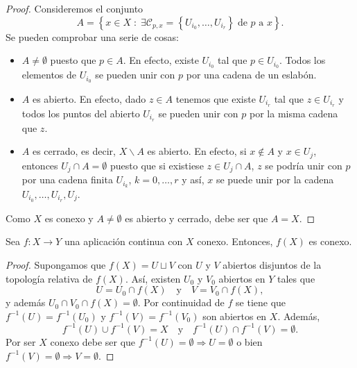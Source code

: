 \begin{proof}
Consideremos el conjunto
\[A = \left\{ x \in X\; : \; \exists\mathcal{C}_{p,x}= \left\{ U_{i_{0}}, \ldots, U_{i_{r}}\right\} \; \text{de }p\text{ a } x\right\}  .\]
Se pueden comprobar una serie de cosas:
\begin{itemize}
\item $\displaystyle A\neq \emptyset $ puesto que $\displaystyle p \in A $. En efecto, existe $\displaystyle U_{i_{0}} $ tal que $\displaystyle p \in U_{i_{0}} $. Todos los elementos de $\displaystyle U_{i_{0}} $ se pueden unir con $\displaystyle p $ por una cadena de un eslabón. 
\item $\displaystyle A $ es abierto. En efecto, dado $\displaystyle z\in A $ tenemos que existe $\displaystyle U_{i_{r}} $ tal que $\displaystyle z \in U_{i_{r}} $ y todos los puntos del abierto $\displaystyle U_{i_{r}} $ se pueden unir con $\displaystyle p $ por la misma cadena que $\displaystyle z $. 
\item $\displaystyle A $ es cerrado, es decir, $\displaystyle X \backslash A $ es abierto. En efecto, si $\displaystyle x \not\in A $ y $\displaystyle x\in U_{j} $, entonces $\displaystyle U_{j}\cap A = \emptyset $ puesto que si existiese $\displaystyle z \in U_{j}\cap A $, $\displaystyle z $ se podría unir con $\displaystyle p $ por una cadena finita $\displaystyle U_{i_{k}} $, $\displaystyle k = 0, \ldots, r $ y así, $\displaystyle x $ se puede unir por la cadena $\displaystyle U_{i_{0}}, \ldots, U_{i_{r}}, U_{j} $. 
\end{itemize}
Como $\displaystyle X $ es conexo y $\displaystyle A \neq \emptyset $ es abierto y cerrado, debe ser que $\displaystyle A = X $.
\end{proof}
\begin{prop}
Sea $\displaystyle f : X \to Y $ una aplicación continua con $\displaystyle X $ conexo. Entonces, $\displaystyle f\left(X\right) $ es conexo. 
\end{prop}
\begin{proof}
Supongamos que $\displaystyle f\left(X\right)=U\sqcup V$ con $\displaystyle U $ y $\displaystyle V $ abiertos disjuntos de la topología relativa de $\displaystyle f\left(X\right) $. Así, existen $\displaystyle U_{0} $ y $\displaystyle V_{0} $ abiertos en $\displaystyle Y $ tales que 
\[U = U_{0}\cap f\left(X\right) \quad \text{y} \quad V = V_{0} \cap f\left(X\right) ,\]
y además $\displaystyle U_{0}\cap V_{0}\cap f\left(X\right)= \emptyset $. Por continuidad de $\displaystyle f $ se tiene que $\displaystyle f^{-1}\left(U\right)=f^{-1}\left(U_{0}\right) $ y $\displaystyle f^{-1}\left(V\right)=f^{-1}\left(V_{0}\right) $ son abiertos en $\displaystyle X $. Además, 
\[f^{-1}\left(U\right)\cup f^{-1}\left(V\right)= X \quad \text{y} \quad f^{-1}\left(U\right)\cap f^{-1}\left(V\right)= \emptyset .\]
Por ser $\displaystyle X $ conexo debe ser que $\displaystyle f^{-1}\left(U\right)= \emptyset \Rightarrow U = \emptyset $ o bien $\displaystyle f^{-1}\left(V\right)=\emptyset \Rightarrow V = \emptyset $. 
\end{proof}
